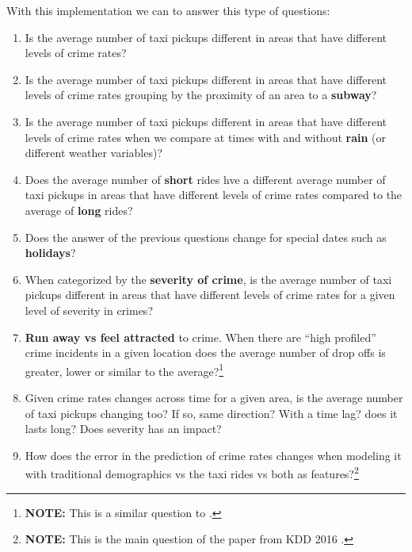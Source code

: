 \documentclass{sigkddExp}
\begin{document}
With this implementation we  can to answer this type of questions:
\begin{enumerate}
       \item Is the average number of taxi pickups different in areas that have different levels of crime rates?

       \item Is the average number of taxi pickups different in areas that have different levels of crime rates grouping by the proximity of an area to a \textbf{subway}? 

       \item Is the average number of taxi pickups different in areas that have different levels of crime rates when we compare at times with and without \textbf{rain} (or different weather variables)?

       \item Does the average  number of \textbf{short} rides hve a different average number of taxi pickups  in areas that have different levels of crime rates  compared to the average of \textbf{long} rides?

       \item Does the answer of the previous questions change for special dates such as \textbf{holidays}?

       \item When categorized by the \textbf{severity of crime}, is the average number of taxi pickups different in areas that have different levels of crime rates for a given level of severity in crimes?

       \item \textbf{Run away vs feel attracted} to crime. When there are ``high profiled'' crime incidents in a given location does the average number of drop offs is greater, lower or similar to the average?\footnote{\textbf{NOTE:} This is a similar question to \cite{Bendler14}.}

       \item Given crime rates changes across time for a given area, is the average number of taxi pickups  changing too? If so, same direction? With a time lag?
       does it lasts long? Does severity has an impact?

       \item How does the error in the prediction of crime rates changes when modeling it with traditional demographics vs the taxi rides vs both as features?\footnote{
       \textbf{NOTE:} This is the main question of the paper from KDD 2016 \cite{Wang16}. }

\end{enumerate}
\end{document}
